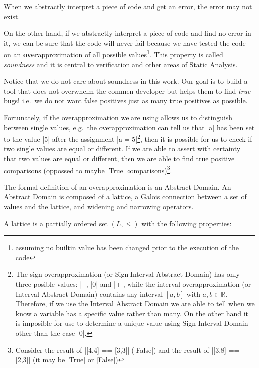 When we abstractly interpret a piece of code and get an error, the error
may not exist.

On the other hand, if we abstractly interpret a piece of code and find
no error in it, we can be sure that the code will never fail because we
have tested the code on an \textbf{over}approximation of all possible
values\footnote{assuming no builtin value has been changed prior to the
  execution of the code}. This property is called \emph{soundness} and
it is central to verification and other areas of Static Analysis.

Notice that we do not care about soundness in this work. Our goal is to
build a tool that does not overwhelm the common developer but helps them
to find \emph{true} bugs! i.e.~we do not want false positives just as
many true positives as possible.

Fortunately, if the overapproximation we are using allows us to
distinguish between single values, e.g.~the overapproximation can tell
us that \pycode|a| has been set to the value \pycode|5| after the
assignment \pycode|a = 5|\footnote{The sign overapproximation (or
  Sign Interval Abstract Domain) has only three posible values:
  \pycode|-|, \pycode|0| and \pycode|+|, while the interval
  overapproximation (or Interval Abstract Domain) contains any interval
  \([a,b]\) with \(a,b \in \mathbb{R}\). Therefore, if we use the
  Interval Abstract Domain we are able to tell when we know a variable
  has a specific value rather than many. On the other hand it is
  imposible for use to determine a unique value using Sign Interval
  Domain other than the case \pycode|0|.}, then it is possible for us to
check if two single values are equal or different. If we are able to
assert with certainty that two values are equal or different, then we
are able to find true positive comparisons (oppossed to maybe
\pycode|True| comparisons)\footnote{Consider the result of
  \pycode|[4,4] == [3,3]| (\pycode|False|) and the result of
  \pycode|[3,8] == [2,3]| (it may be \pycode|True| or
  \pycode|False|)}.

The formal definition of an overapproximation is an Abstract Domain. An
Abstract Domain is composed of a lattice, a Galois connection between a
set of values and the lattice, and widening and narrowing operators.

A lattice is a partially ordered set \((L, \le)\) with the following
properties:

